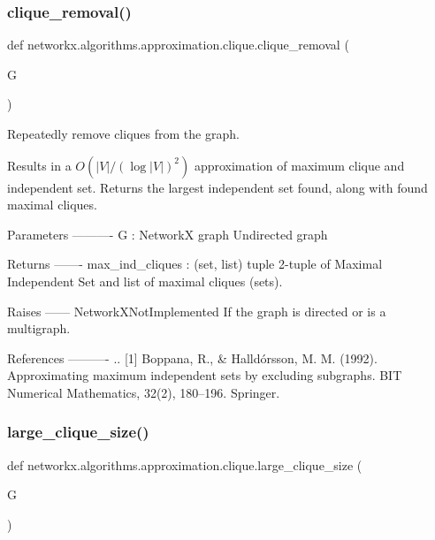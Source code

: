 \subsubsection{\texorpdfstring{clique\+\_\+removal()}{clique\_removal()}}
{\footnotesize\ttfamily def networkx.\+algorithms.\+approximation.\+clique.\+clique\+\_\+removal (\begin{DoxyParamCaption}\item[{}]{G }\end{DoxyParamCaption})}

\begin{DoxyVerb}Repeatedly remove cliques from the graph.

Results in a $O(|V|/(\log |V|)^2)$ approximation of maximum clique
and independent set. Returns the largest independent set found, along
with found maximal cliques.

Parameters
----------
G : NetworkX graph
    Undirected graph

Returns
-------
max_ind_cliques : (set, list) tuple
    2-tuple of Maximal Independent Set and list of maximal cliques (sets).

Raises
------
NetworkXNotImplemented
    If the graph is directed or is a multigraph.

References
----------
.. [1] Boppana, R., & Halldórsson, M. M. (1992).
    Approximating maximum independent sets by excluding subgraphs.
    BIT Numerical Mathematics, 32(2), 180–196. Springer.
\end{DoxyVerb}
 \mbox{\label{namespacenetworkx_1_1algorithms_1_1approximation_1_1clique_a847f951b783309c66549bd763641407d}} 
\subsubsection{\texorpdfstring{large\+\_\+clique\+\_\+size()}{large\_clique\_size()}}
{\footnotesize\ttfamily def networkx.\+algorithms.\+approximation.\+clique.\+large\+\_\+clique\+\_\+size (\begin{DoxyParamCaption}\item[{}]{G }\end{DoxyParamCaption})}

